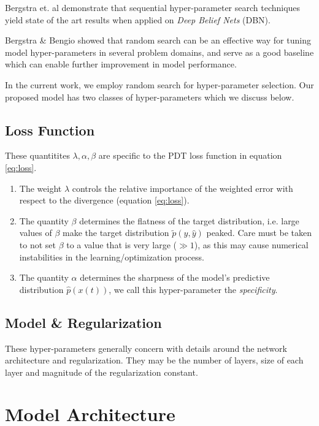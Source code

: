 \documentclass[envcountsect,runningheads]{llncs}
\theoremstyle{etoile}
\begin{document}
Bergstra et. al \cite{hypBengio} demonstrate that sequential hyper-parameter search techniques yield state of the art 
results when applied on \emph{Deep Belief Nets} (DBN). 

Bergstra \& Bengio \cite{randomsearchBengio} showed that random search can be an effective way for tuning model 
hyper-parameters in several problem domains, and serve as a good baseline which can enable 
further improvement in model performance.


In the current work, we employ random search for hyper-parameter selection. 
Our proposed model has two classes of hyper-parameters which we discuss below.

\subsection{Loss Function}

These quantitites $\lambda, \alpha, \beta$ are specific to the PDT loss function in equation 
\ref{eq:loss}. 

\begin{enumerate}
\item The weight $\lambda$ controls the relative importance of the weighted error with 
      respect to the divergence (equation \ref{eq:loss}).
\item The quantity $\beta$ determines the flatness of the target distribution, i.e. large values of $\beta$ 
      make the target distribution $\tilde{p}(y, \hat{y})$ peaked. Care must be taken to not set $\beta$ to a value
      that is very large ($\gg 1$), as this may cause numerical instabilities in the learning/optimization process.
\item The quantity $\alpha$ determines the sharpness of the model's predictive distribution $\hat{p}(x(t))$, 
      we call this hyper-parameter the \emph{specificity}.        
\end{enumerate}
 

\subsection{Model \& Regularization}

These hyper-parameters generally concern with details around the network architecture and 
regularization. They may be the number of layers, size of each layer and magnitude of the 
regularization constant.



\section{Model Architecture}
\end{document}
